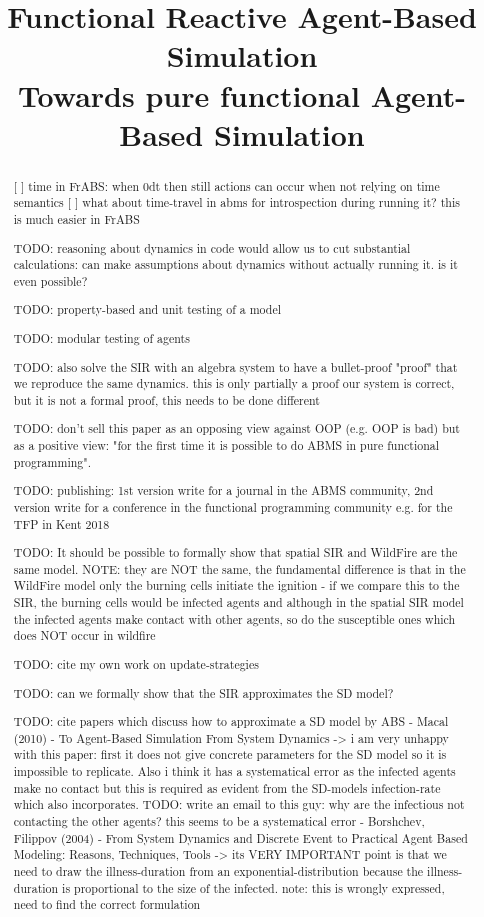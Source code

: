 \documentclass[10pt, conference]{../../templates/IEEEtran/IEEEtran}
\title{Functional Reactive Agent-Based Simulation\\{\subtitlefont Towards pure functional Agent-Based Simulation}}
\author{
	\IEEEauthorblockN{Jonathan Thaler}
	\IEEEauthorblockA{School of Computer Science\\
		University of Nottingham\\
		jonathan.thaler@nottingham.ac.uk}
		
	\and
		
	\IEEEauthorblockN{Peer-Olaf Siebers}
	\IEEEauthorblockA{School of Computer Science\\
		University of Nottingham\\
		peer-olaf.siebers@nottingham.ac.uk}
		
	\and
		
	\IEEEauthorblockN{Thorsten Altenkirch}
	\IEEEauthorblockA{School of Computer Science\\
		University of Nottingham\\
		thorsten.altenkirch@nottingham.ac.uk}
}
\begin{document}
\maketitle 

\begin{abstract}


[ ] time in FrABS: when 0dt then still actions can occur when not relying on time semantics
[ ] what about time-travel in abms for introspection during running it? this is much easier in FrABS

TODO: reasoning about dynamics in code would allow us to cut substantial calculations: can make assumptions about dynamics without actually running it. is it even possible?

TODO: property-based and unit testing of a model

TODO: modular testing of agents

TODO: also solve the SIR with an algebra system to have a bullet-proof "proof" that we reproduce the same dynamics. this is only partially a proof our system is correct, but it is not a formal proof, this needs to be done different

TODO: don't sell this paper as an opposing view against OOP (e.g. OOP is bad) but as a positive view: "for the first time it is possible to do ABMS in pure functional programming".

TODO: publishing: 1st version write for a journal in the ABMS community, 2nd version write for a conference in the functional programming community e.g. for the TFP in Kent 2018

TODO: It should be possible to formally show that spatial SIR and WildFire are the same model. NOTE: they are NOT the same, the fundamental difference is that in the WildFire model only the burning cells initiate the ignition - if we compare this to the SIR, the burning cells would be infected agents and although in the spatial SIR model the infected agents make contact with other agents, so do the susceptible ones which does NOT occur in wildfire

TODO: cite my own work on update-strategies

TODO: can we formally show that the SIR approximates the SD model?

TODO: cite papers which discuss how to approximate a SD model by ABS
- Macal (2010) - To Agent-Based Simulation From System Dynamics 
	-> i am very unhappy with this paper: first it does not give concrete parameters for the SD model so it is impossible to replicate. Also i think it has a systematical error as the infected agents make no contact but this is required as evident from the SD-models infection-rate which also incorporates. TODO: write an email to this guy: why are the infectious not contacting the other agents? this seems to be a systematical error
- Borshchev, Filippov (2004) - From System Dynamics and Discrete Event to Practical Agent Based Modeling: Reasons, Techniques, Tools
	-> its VERY IMPORTANT point is that we need to draw the illness-duration from an exponential-distribution because the illness-duration is proportional to the size of the infected. note: this is wrongly expressed, need to find the correct formulation


\end{abstract}
\end{document}
